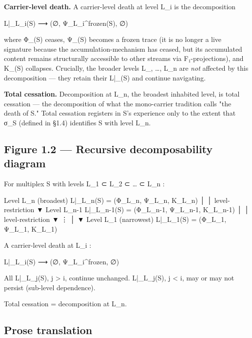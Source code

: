 \documentclass[11pt, openany]{book}
\begin{document}
\textbf{Carrier-level death.} A carrier-level death at level L\_\allowbreak{}i is the decomposition
\begin{Code}
L|_{L_i}(S) ⟶ (∅, Ψ_{L_i}^frozen(S), ∅)
\end{Code}
where Φ\_(S) ceases, Ψ\_(S) becomes a frozen trace (it is no longer a live signature because the accumulation-mechanism has ceased, but its accumulated content remains structurally accessible to other streams via F₁-projections), and Κ\_(S) collapses. Crucially, the broader levels L\_, …, L\_\allowbreak{}n are \textit{not} affected by this decomposition --- they retain their L|\_(S) and continue navigating.

\textbf{Total cessation.} Decomposition at L\_\allowbreak{}n, the broadest inhabited level, is total cessation --- the decomposition of what the mono-carrier tradition calls "the death of S." Total cessation registers in S's experience only to the extent that σ\_\allowbreak{}S (defined in §1.4) identifies S with level L\_\allowbreak{}n.

\subsection{Figure 1.2 --- Recursive decomposability diagram}

\begin{Code}
For multiplex S with levels L_1 ⊂ L_2 ⊂ … ⊂ L_n :

    Level L_n (broadest)      L|_{L_n}(S) = (Φ_{L_n}, Ψ_{L_n}, Κ_{L_n})
         │
         │   level-restriction
         ▼
    Level L_{n-1}             L|_{L_{n-1}}(S) = (Φ_{L_{n-1}}, Ψ_{L_{n-1}}, Κ_{L_{n-1}})
         │
         │   level-restriction
         ▼
         ⋮
         │
         ▼
    Level L_1 (narrowest)     L|_{L_1}(S) = (Φ_{L_1}, Ψ_{L_1}, Κ_{L_1})


A carrier-level death at L_i :

    L|_{L_i}(S) ⟶ (∅, Ψ_{L_i}^frozen, ∅)

    All L|_{L_j}(S), j > i, continue unchanged.
    L|_{L_j}(S), j < i, may or may not persist (sub-level dependence).

Total cessation = decomposition at L_n.
\end{Code}

\subsection{Prose translation}
\end{document}

